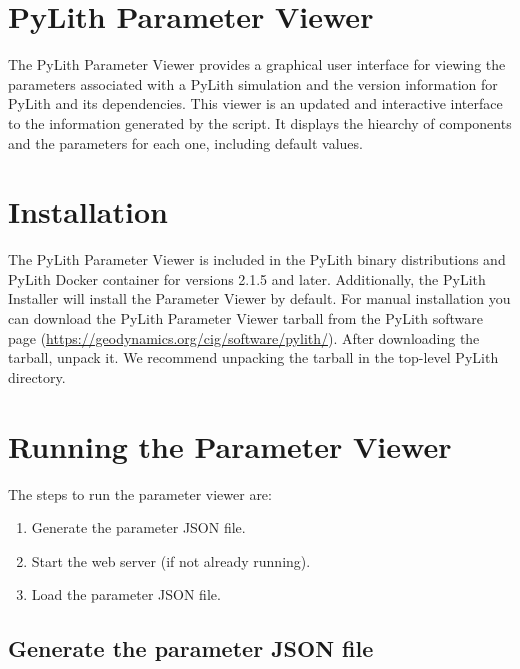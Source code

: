 \section{PyLith Parameter Viewer}
\label{sec:pylith:parameter:viewer}

The PyLith Parameter Viewer provides a graphical user interface for
viewing the parameters associated with a PyLith simulation and the
version information for PyLith and its dependencies. This viewer is
an updated and interactive interface to the information generated
by the  script. It displays the hiearchy of components
and the parameters for each one, including default values.


\section{Installation}

The PyLith Parameter Viewer is included in the PyLith binary
distributions and PyLith Docker container for versions 2.1.5 and
later. Additionally, the PyLith Installer will install the Parameter
Viewer by default.  For manual installation you can download the
PyLith Parameter Viewer tarball from the PyLith software page
(\url{https://geodynamics.org/cig/software/pylith/}).  After
downloading the tarball, unpack it. We recommend unpacking the tarball
in the top-level PyLith directory.

\section{Running the Parameter Viewer}

The steps to run the parameter viewer are:
\begin{enumerate}
\item Generate the parameter JSON file.
\item Start the web server (if not already running).
\item Load the parameter JSON file.
\end{enumerate}

\subsection{Generate the parameter JSON file}

